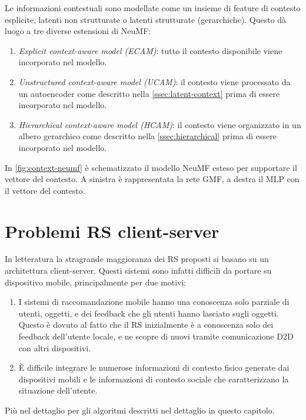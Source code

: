 Le informazioni contestuali sono modellate come un insieme di feature di contesto esplicite, latenti non strutturate o latenti strutturate (gerarchiche). Questo dà luogo a tre diverse estensioni di NeuMF:
\begin{enumerate}
 \item \textit{Explicit context-aware model (ECAM)}: tutto il contesto disponibile viene incorporato nel modello.
 \item \textit{Unstructured context-aware model (UCAM)}: il contesto viene processato da un autoencoder \cite{latent-context} come descritto nella \autoref{ssec:latent-context} prima di essere incorporato nel modello.
 \item \textit{Hierarchical context-aware model (HCAM)}: il contesto viene organizzato in un albero gerarchico \cite{hierarchical-context} come descritto nella \autoref{ssec:hierarchical} prima di essere incorporato nel modello.
\end{enumerate}
In \autoref{fig:context-neumf} è schematizzato il modello NeuMF  esteso per supportare il vettore del contesto. A sinistra è rappresentata la rete GMF, a destra il MLP con il vettore del contesto.


\section{Problemi RS client-server}
In letteratura la stragrande maggioranza dei RS proposti si basano su un architettura client-server. Questi sistemi sono infatti difficili da portare su dispositivo mobile, principalmente per due motivi:
\begin{enumerate}
 \item I sistemi di raccomandazione mobile hanno una conoscenza solo parziale di utenti, oggetti, e dei feedback che gli utenti hanno lasciato sugli oggetti. Questo è dovuto al fatto che il RS inizialmente è a conoscenza solo dei feedback dell'utente locale, e ne scopre di nuovi tramite comunicazione D2D con altri dispositivi. 
 
 \item \`E difficile integrare le numerose informazioni di contesto fisico generate dai dispositivi mobili e le informazioni di contesto sociale che caratterizzano la situazione dell'utente.
\end{enumerate}

Più nel dettaglio per gli algoritmi descritti nel dettaglio in questo capitolo.

